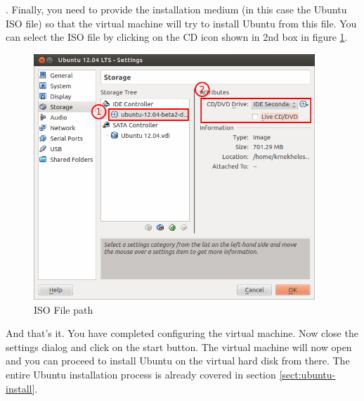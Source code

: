 \par {}. Finally, you need to provide the installation medium (in this case the Ubuntu ISO file) so that the virtual machine will try to install Ubuntu from this file. You can select the ISO file by clicking on the CD icon shown in 2nd box in figure \ref{fig:settings-storage}. \\

\begin{figure}[!h]	
	\centering
	\includegraphics[width=300pt]{./images/installation/virtualbox/settings-storage.png}
	\caption{ISO File path}	
	\label{fig:settings-storage}	
\end{figure}

\par \noindent And that's it. You have completed configuring the virtual machine. Now close the settings dialog and click on the start button. The virtual machine will now open and you can proceed to install Ubuntu on the virtual hard disk from there. The entire Ubuntu installation process is already covered in section \ref{sect:ubuntu-install}. \\




